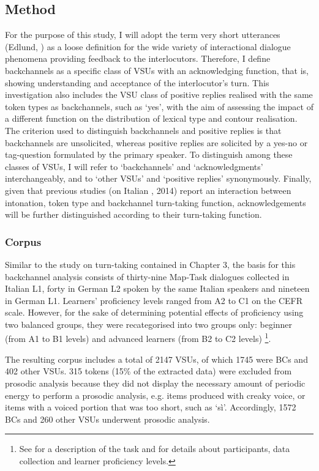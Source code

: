 \subsection{Method}
\hypertarget{Toc191305947}{}
For the purpose of this study, I will adopt the term very short utterances (Edlund, \citealt{HeldnerPelcé2009}) as a loose definition for the wide variety of interactional dialogue phenomena providing feedback to the interlocutors. Therefore, I define backchannels as a specific class of VSUs with an acknowledging function, that is, showing understanding and acceptance of the interlocutor’s turn. This investigation also includes the VSU class of positive replies realised with the same token types as backchannels, such as ‘yes’, with the aim of assessing the impact of a different function on the distribution of lexical type and contour realisation. The criterion used to distinguish backchannels and positive replies is that backchannels are unsolicited, whereas positive replies are solicited by a yes-no or tag-question formulated by the primary speaker. To distinguish among these classes of VSUs, I will refer to ‘backchannels’ and ‘acknowledgments’ interchangeably, and to ‘other VSUs’ and ‘positive replies’ synonymously. Finally, given that previous studies (on Italian \citealt{Savino2010,Savino2011}, 2014) report an interaction between intonation, token type and backchannel turn-taking function, acknowledgements will be further distinguished according to their turn-taking function.

\subsubsection{Corpus}
\hypertarget{Toc191305948}{}
Similar to the study on turn-taking contained in Chapter 3, the basis for this backchannel analysis consists of thirty-nine Map-Task dialogues collected in Italian L1, forty in German L2 spoken by the same Italian speakers and nineteen in German L1. Learners’ proficiency levels ranged from A2 to C1 on the CEFR scale. However, for the sake of determining potential effects of proficiency using two balanced groups, they were recategorised into two groups only: beginner (from A1 to B1 levels) and advanced learners (from B2 to C2 levels)\textstyleFootnoteSymbol{} \footnote{See  for a description of the task and  for details about participants, data collection and learner proficiency levels.}.

The resulting corpus includes a total of 2147 VSUs, of which 1745 were BCs and 402 other VSUs. 315 tokens (15\% of the extracted data) were excluded from prosodic analysis because they did not display the necessary amount of periodic energy to perform a prosodic analysis, e.g. items produced with creaky voice, or items with a voiced portion that was too short, such as ‘sì’. Accordingly, 1572 BCs and 260 other VSUs underwent prosodic analysis. 

